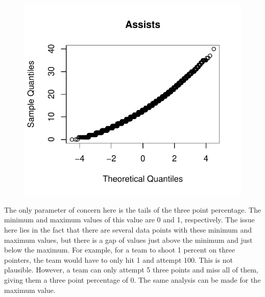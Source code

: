 \documentclass[]{scrartcl}
\begin{document}
\begin{figure}[H]
	\includegraphics[scale=.6]{assnorm.pdf}
\end{figure}
The only parameter of concern here is the tails of the three point percentage. The minimum and maximum values of this value are 0 and 1, respectively. The issue here lies in the fact that there are several data points with these minimum and maximum values, but there is a gap of values just above the minimum and just below the maximum. For example, for a team to shoot 1 percent on three pointers, the team would have to only hit 1 and attempt 100. This is not plausible. However, a team can only attempt 5 three points and miss all of them, giving them a three point percentage of 0. The same analysis can be made for the maximum value. 
\end{document}
